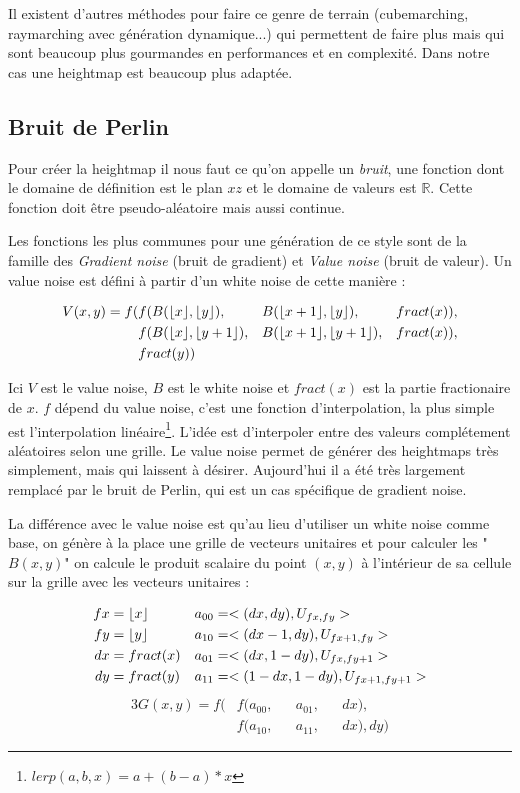 \documentclass[11pt]{article} %
\DeclarePairedDelimiter\floor{\lfloor}{\rfloor}%
\DeclarePairedDelimiter\fract{fract(}{)}
\begin{document}

Il existent d'autres méthodes pour faire ce genre de terrain (cubemarching, raymarching avec génération dynamique...) qui permettent de faire plus mais qui sont beaucoup plus gourmandes en performances et en complexité. Dans notre cas une heightmap est beaucoup plus adaptée.

\subsection{Bruit de Perlin}

Pour créer la heightmap il nous faut ce qu'on appelle un \textit{bruit}, une fonction dont le domaine de définition est le plan $xz$ et le domaine de valeurs est $\mathbb{R}$. Cette fonction doit être pseudo-aléatoire mais aussi continue.


Les fonctions les plus communes pour une génération de ce style sont de la famille des \textit{Gradient noise} (bruit de gradient) et \textit{Value noise} (bruit de valeur).
Un value noise est défini à partir d'un white noise de cette manière :

\begin{alignat*}{3}
	V(x,y) =f( &f(B(\floor{x},\floor{y}), &&B(\floor{x+1},\floor{y}), &&\fract{x}),\\
			&f(B(\floor{x},\floor{y+1}), &&B(\floor{x+1},\floor{y+1}), &&\fract{x}),\\
			&\fract{y})
\end{alignat*}

Ici $V$ est le value noise, $B$ est le white noise et $fract(x)$ est la partie fractionaire de $x$. $f$ dépend du value noise, c'est une fonction d'interpolation, la plus simple est l'interpolation linéaire\footnote{$lerp(a,b,x) = a+(b-a)*x$}.
L'idée est d'interpoler entre des valeurs complétement aléatoires selon une grille. Le value noise permet de générer des heightmaps très simplement, mais qui laissent à désirer. Aujourd'hui il a été très largement remplacé par le bruit de Perlin, qui est un cas spécifique de gradient noise.

La différence avec le value noise est qu'au lieu d'utiliser un white noise comme base, on génère à la place une grille de vecteurs unitaires et pour calculer les "$B(x,y)$" on calcule le produit scalaire du point $(x,y)$ à l'intérieur de sa cellule sur la grille avec les vecteurs unitaires :

\begin{align*}
	fx&=\floor{x} & a_{00}&=<(dx,dy), U_{fx,fy}>\\
	fy&=\floor{y} & a_{10}&=<(dx-1,dy), U_{fx+1,fy}>\\
	dx&=\fract{x} & a_{01}&=<(dx,1-dy), U_{fx,fy+1}>\\
	dy&=\fract{y} & a_{11}&=<(1-dx,1-dy), U_{fx+1,fy+1}>
\end{align*}
\begin{alignat*}{3}
	G(x,y) =f( &f(a_{00}, &&a_{01}, &&dx),\\
			&f(a_{10}, &&a_{11}, &&dx), dy)
\end{alignat*}
\end{document}

